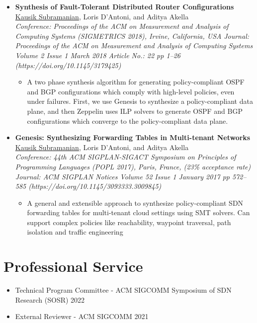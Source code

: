 \documentclass[11pt,a4paper,sans]{moderncv}        %
\begin{document}
\begin{itemize}
	\item \textbf{Synthesis of Fault-Tolerant Distributed Router
		Configurations} \\
\underline{Kausik Subramanian}, Loris D’Antoni, and Aditya Akella \\
	\emph{Conference: Proceedings of the ACM on Measurement and Analysis of Computing Systems (SIGMETRICS 2018), Irvine, California, USA} \newline
	\emph{Journal: Proceedings of the ACM on Measurement and Analysis of Computing Systems Volume 2 Issue 1 March 2018 Article No.: 22 pp 1–26 (https://doi.org/10.1145/3179425)}
	\begin{itemize}
		\item A two phase synthesis algorithm for generating policy-compliant
		OSPF and BGP configurations which comply with high-level policies, even
		under failures. First, we use Genesis to synthesize a policy-compliant
		data plane, and then Zeppelin uses ILP solvers to generate OSPF and BGP
		configurations which converge to the policy-compliant data plane.
	\end{itemize}
	\vspace*{4mm}

	\item \textbf{Genesis: Synthesizing Forwarding Tables in Multi-tenant Networks} \\
	\underline{Kausik Subramanian}, Loris D’Antoni, and Aditya Akella \\
	\emph{Conference: 44th ACM SIGPLAN-SIGACT Symposium on Principles of Programming Languages (POPL 2017), Paris, France, (23\% acceptance rate)} \newline
	\emph{Journal: ACM SIGPLAN Notices Volume 52 Issue 1 January 2017 pp 572–585 (https://doi.org/10.1145/3093333.3009845)}
	\begin{itemize}
		\item A general and extensible approach to synthesize policy-compliant
		SDN forwarding tables for multi-tenant cloud settings using SMT solvers.
		Can support complex policies like reachability, waypoint traversal, path
		isolation and traffic engineering
	\end{itemize}
	\vspace*{4mm}
\end{itemize}

\section{Professional Service}
\begin{itemize}
\item Technical Program Committee - ACM SIGCOMM Symposium of SDN Research (SOSR) 2022
\item External Reviewer - ACM SIGCOMM 2021

\end{itemize}
\end{document}
